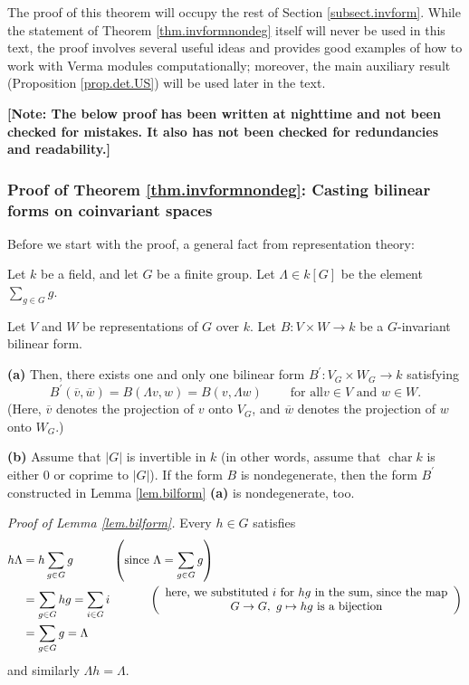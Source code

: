 \documentclass[etingof-lie.tex]{subfiles}
\begin{document}
The proof of this theorem will occupy the rest of Section
\ref{subsect.invform}. While the statement of Theorem \ref{thm.invformnondeg}
itself will never be used in this text, the proof involves several useful
ideas and provides good examples of how to work with Verma modules
computationally; moreover, the main auxiliary result (Proposition
\ref{prop.det.US}) will be used later in the text.

\textbf{[Note: The below proof has been written at nighttime and not been
checked for mistakes. It also has not been checked for redundancies and
readability.]}

\subsubsection{Proof of Theorem \ref{thm.invformnondeg}: Casting bilinear
forms on coinvariant spaces}

Before we start with the proof, a general fact from representation theory:

\begin{lemma}
\label{lem.bilform}Let $k$ be a field, and let $G$ be a finite group. Let
$\Lambda\in k\left[  G\right]  $ be the element $\sum\limits_{g\in G}g$.

Let $V$ and $W$ be representations of $G$ over $k$. Let $B:V\times
W\rightarrow k$ be a $G$-invariant bilinear form.

\textbf{(a)} Then, there exists one and only one bilinear form $B^{\prime
}:V_{G}\times W_{G}\rightarrow k$ satisfying%
\[
B^{\prime}\left(  \overline{v},\overline{w}\right)  =B\left(  \Lambda
v,w\right)  =B\left(  v,\Lambda w\right)  \ \ \ \ \ \ \ \ \ \ \text{for all
}v\in V\text{ and }w\in W\text{.}%
\]
(Here, $\overline{v}$ denotes the projection of $v$ onto $V_{G}$, and
$\overline{w}$ denotes the projection of $w$ onto $W_{G}$.)

\textbf{(b)} Assume that $\left\vert G\right\vert $ is invertible in $k$ (in
other words, assume that $\operatorname*{char}k$ is either $0$ or coprime to
$\left\vert G\right\vert $). If the form $B$ is nondegenerate, then the form
$B^{\prime}$ constructed in Lemma \ref{lem.bilform} \textbf{(a)} is
nondegenerate, too.
\end{lemma}

\textit{Proof of Lemma \ref{lem.bilform}.} Every $h\in G$ satisfies%
\begin{align*}
h\Lambda &  =h\sum\limits_{g\in G}g\ \ \ \ \ \ \ \ \ \ \left(  \text{since
}\Lambda=\sum\limits_{g\in G}g\right) \\
&  =\sum\limits_{g\in G}hg=\sum\limits_{i\in G}i\ \ \ \ \ \ \ \ \ \ \left(
\begin{array}
[c]{c}%
\text{here, we substituted }i\text{ for }hg\text{ in the sum, since the map}\\
G\rightarrow G,\ g\mapsto hg\text{ is a bijection}%
\end{array}
\right) \\
&  =\sum\limits_{g\in G}g=\Lambda
\end{align*}
and similarly $\Lambda h=\Lambda$.
\end{document}
